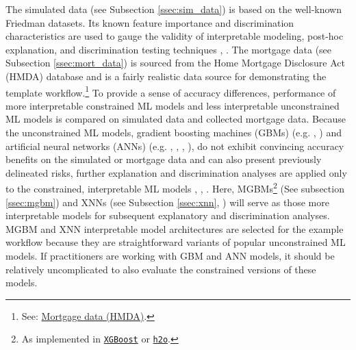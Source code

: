 \documentclass[information,article,submit,moreauthors,pdftex]{definitions/mdpi}
\begin{document}
The simulated data (see Subsection \ref{ssec:sim_data}) is based on the well-known Friedman datasets. Its known feature importance and discrimination characteristics are used to gauge the validity of interpretable modeling, post-hoc explanation, and discrimination testing techniques \cite{friedman1979tree}, \cite{friedman1991multivariate}. The mortgage data (see Subsection \ref{ssec:mort_data}) is sourced from the Home Mortgage Disclosure Act (HMDA) database and is a fairly realistic data source for demonstrating the template workflow.\footnote{See: \href{https://www.consumerfinance.gov/data-research/hmda/}{Mortgage data (HMDA)}.} To provide a sense of accuracy differences, performance of more interpretable constrained ML models and less interpretable unconstrained ML models is compared on simulated data and collected mortgage data. Because the unconstrained ML models, gradient boosting machines (GBMs) (e.g. \cite{friedman2001greedy}, \cite{esl}) and artificial neural networks (ANNs) (e.g. \cite{recht2011hogwild}, \cite{hinton2012improving}, \cite{sutskever2013importance}, \cite{zeiler2012adadelta}), do not exhibit convincing accuracy benefits on the simulated or mortgage data and can also present previously delineated risks, further explanation and discrimination analyses are applied only to the constrained, interpretable ML models \cite{please_stop}, \cite{fair_washing}, \cite{scaffolding}. Here, MGBMs\footnote{As implemented in \href{https://xgboost.readthedocs.io/en/latest/tutorials/monotonic.html}{\texttt{XGBoost}} or \href{https://github.com/h2oai/h2o-3/blob/master/h2o-py/demos/H2O_tutorial_gbm_monotonicity.ipynb}{\texttt{h2o}}.} (See subsection \ref{ssec:mgbm}) and XNNs (see Subsection \ref{ssec:xnn}, \cite{wf_xnn} \cite{yang2019enhancing}) will serve as those more interpretable models for subsequent explanatory and discrimination analyses. MGBM and XNN interpretable model architectures are selected for the example workflow because they are straightforward variants of popular unconstrained ML models. If practitioners are working with GBM and ANN models, it should be relatively uncomplicated to also evaluate the constrained versions of these models. 
\end{document}
